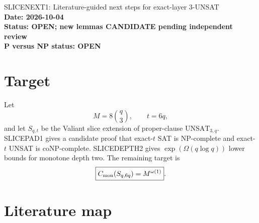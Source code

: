 \documentclass[11pt]{article}
\begin{document}
\begin{center}
{\Large SLICENEXT1: Literature-guided next steps for exact-layer 3-UNSAT}\\[4pt]
\textbf{Date: 2026-10-04}\\
\textbf{Status: OPEN; new lemmas CANDIDATE pending independent review}\\
\textbf{P versus NP status: OPEN}
\end{center}

\section{Target}

Let
\[
M=8\binom q3,\qquad t=6q,
\]
and let \(S_{q,t}\) be the Valiant slice extension of proper-clause
\(\mathrm{UNSAT}_{3,q}\). SLICEPAD1 gives a candidate proof that exact-\(t\)
SAT is NP-complete and exact-\(t\) UNSAT is coNP-complete. SLICEDEPTH2 gives
\(\exp(\Omega(q\log q))\) lower bounds for monotone depth two. The remaining target is
\[
\boxed{C_{\rm mon}(S_{q,6q})=M^{\omega(1)}}.
\]

\section{Literature map}
\end{document}
